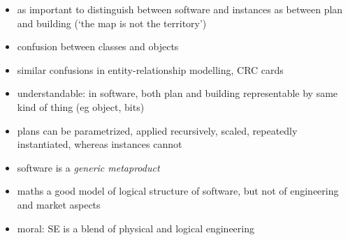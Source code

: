 \documentclass{sepslide-soa-faked} %
\begin{document}
\begin{slide}
\begin{itemize}
\item as important to distinguish between software and instances as between
plan and building (`the map is not the territory')
\item confusion between classes and objects
\item similar confusions in entity-relationship modelling, CRC cards
\item understandable: in software, both plan and building representable by
same kind of thing (eg object, bits)
\item plans can be parametrized, applied recursively,
scaled, repeatedly instantiated, whereas instances cannot
\item software is a \emph{generic metaproduct}
\item maths a good model of logical structure of software, but not of
engineering and market aspects
\item moral: SE is a blend of physical and logical engineering
\end{itemize}
\end{slide}

\end{document}
